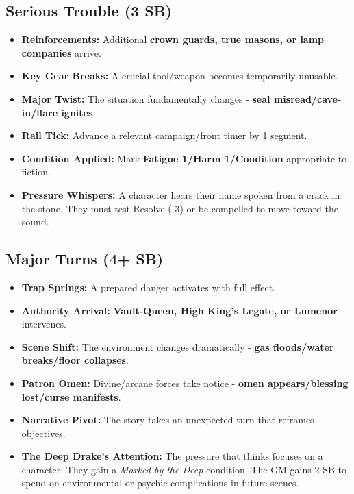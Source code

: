 \subsection*{Serious Trouble (3 SB)}
\begin{itemize}
\item \textbf{Reinforcements:} Additional \textbf{crown guards, true masons, or lamp companies} arrive.
\item \textbf{Key Gear Breaks:} A crucial tool/weapon becomes temporarily unusable.
\item \textbf{Major Twist:} The situation fundamentally changes - \textbf{seal misread/cave-in/flare ignites}.
\item \textbf{Rail Tick:} Advance a relevant campaign/front timer by 1 segment.
\item \textbf{Condition Applied:} Mark \textbf{Fatigue 1/Harm 1/Condition} appropriate to fiction.
\item \textbf{Pressure Whispers:} A character hears their name spoken from a crack in the stone. They must test Resolve (\DV{} 3) or be compelled to move toward the sound.
\end{itemize}

\subsection*{Major Turns (4+ SB)}
\begin{itemize}
\item \textbf{Trap Springs:} A prepared danger activates with full effect.
\item \textbf{Authority Arrival:} \textbf{Vault-Queen, High King's Legate, or Lumenor} intervenes.
\item \textbf{Scene Shift:} The environment changes dramatically - \textbf{gas floods/water breaks/floor collapses}.
\item \textbf{Patron Omen:} Divine/arcane forces take notice - \textbf{omen appears/blessing lost/curse manifests}.
\item \textbf{Narrative Pivot:} The story takes an unexpected turn that reframes objectives.
\item \textbf{The Deep Drake's Attention:} The pressure that thinks focuses on a character. They gain a \emph{Marked by the Deep} condition. The GM gains 2 SB to spend on environmental or psychic complications in future scenes.
\end{itemize}

